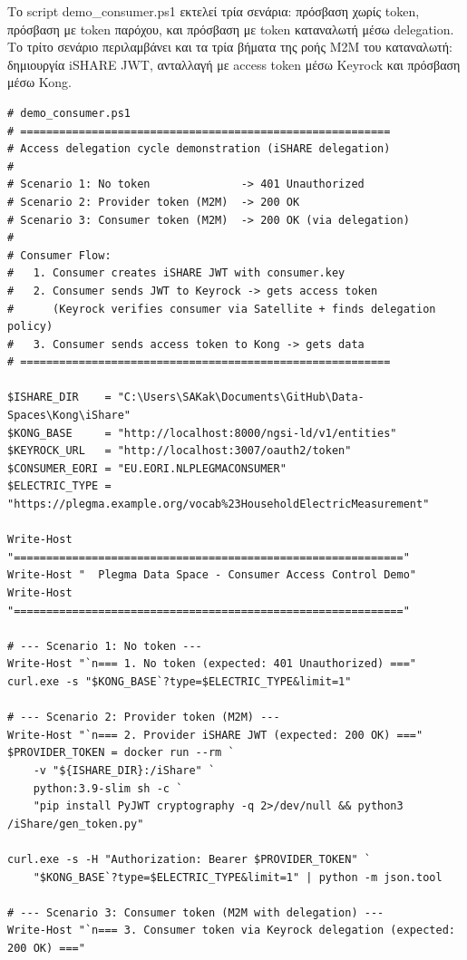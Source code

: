 Το \textlatin{script} \textlatin{demo\_consumer.ps1} εκτελεί τρία σενάρια:
πρόσβαση χωρίς \textlatin{token}, πρόσβαση με \textlatin{token} παρόχου,
και πρόσβαση με \textlatin{token} καταναλωτή μέσω \textlatin{delegation}.
Το τρίτο σενάριο περιλαμβάνει και τα τρία βήματα της ροής
\textlatin{M2M} του καταναλωτή: δημιουργία \textlatin{iSHARE JWT},
ανταλλαγή με \textlatin{access token} μέσω \textlatin{Keyrock} και
πρόσβαση μέσω \textlatin{Kong}.

\begin{lstlisting}[language={},]
# demo_consumer.ps1
# =========================================================
# Access delegation cycle demonstration (iSHARE delegation)
#
# Scenario 1: No token              -> 401 Unauthorized
# Scenario 2: Provider token (M2M)  -> 200 OK
# Scenario 3: Consumer token (M2M)  -> 200 OK (via delegation)
#
# Consumer Flow:
#   1. Consumer creates iSHARE JWT with consumer.key
#   2. Consumer sends JWT to Keyrock -> gets access token
#      (Keyrock verifies consumer via Satellite + finds delegation policy)
#   3. Consumer sends access token to Kong -> gets data
# =========================================================

$ISHARE_DIR    = "C:\Users\SAKak\Documents\GitHub\Data-Spaces\Kong\iShare"
$KONG_BASE     = "http://localhost:8000/ngsi-ld/v1/entities"
$KEYROCK_URL   = "http://localhost:3007/oauth2/token"
$CONSUMER_EORI = "EU.EORI.NLPLEGMACONSUMER"
$ELECTRIC_TYPE = "https://plegma.example.org/vocab%23HouseholdElectricMeasurement"

Write-Host "============================================================"
Write-Host "  Plegma Data Space - Consumer Access Control Demo"
Write-Host "============================================================"

# --- Scenario 1: No token ---
Write-Host "`n=== 1. No token (expected: 401 Unauthorized) ==="
curl.exe -s "$KONG_BASE`?type=$ELECTRIC_TYPE&limit=1"

# --- Scenario 2: Provider token (M2M) ---
Write-Host "`n=== 2. Provider iSHARE JWT (expected: 200 OK) ==="
$PROVIDER_TOKEN = docker run --rm `
    -v "${ISHARE_DIR}:/iShare" `
    python:3.9-slim sh -c `
    "pip install PyJWT cryptography -q 2>/dev/null && python3 /iShare/gen_token.py"

curl.exe -s -H "Authorization: Bearer $PROVIDER_TOKEN" `
    "$KONG_BASE`?type=$ELECTRIC_TYPE&limit=1" | python -m json.tool

# --- Scenario 3: Consumer token (M2M with delegation) ---
Write-Host "`n=== 3. Consumer token via Keyrock delegation (expected: 200 OK) ==="


\end{lstlisting}
